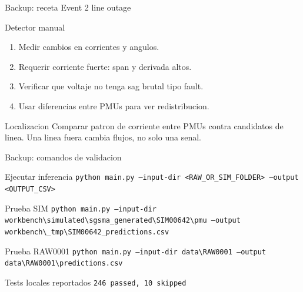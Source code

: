 \documentclass[10pt,aspectratio=169]{beamer}
\newcommand{\code}[1]{\texttt{\footnotesize #1}}
\begin{document}
\begin{frame}{Backup: receta Event 2 line outage}
\small
\begin{block}{Detector manual}
\begin{enumerate}
  \item Medir cambios en corrientes y angulos.
  \item Requerir corriente fuerte: span y derivada altos.
  \item Verificar que voltaje no tenga sag brutal tipo fault.
  \item Usar diferencias entre PMUs para ver redistribucion.
\end{enumerate}
\end{block}
\begin{exampleblock}{Localizacion}
Comparar patron de corriente entre PMUs contra candidatos de linea. Una linea fuera cambia flujos, no solo una senal.
\end{exampleblock}
\end{frame}

\begin{frame}{Backup: comandos de validacion}
\small
\begin{block}{Ejecutar inferencia}
\code{python main.py --input-dir <RAW\_OR\_SIM\_FOLDER> --output <OUTPUT\_CSV>}
\end{block}
\begin{block}{Prueba SIM}
\code{python main.py --input-dir workbench\textbackslash simulated\textbackslash sgsma\_generated\textbackslash SIM00642\textbackslash pmu --output workbench\textbackslash \_tmp\textbackslash SIM00642\_predictions.csv}
\end{block}
\begin{block}{Prueba RAW0001}
\code{python main.py --input-dir data\textbackslash RAW0001 --output data\textbackslash RAW0001\textbackslash predictions.csv}
\end{block}
\begin{exampleblock}{Tests locales reportados}
\code{246 passed, 10 skipped}
\end{exampleblock}
\end{frame}
\end{document}

